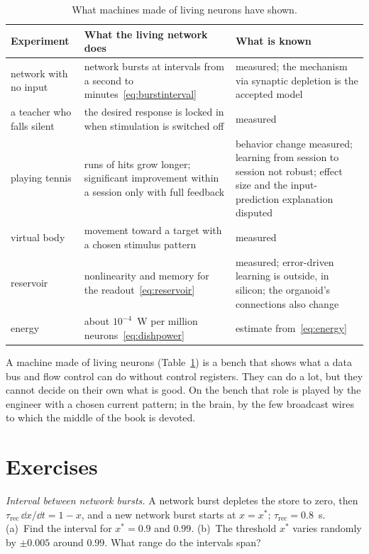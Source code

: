 \begin{table}[t]
\centering
\footnotesize
\setlength{\tabcolsep}{4pt}
\renewcommand{\arraystretch}{1.15}
\begin{tabular}{>{\raggedright}p{2.8cm}>{\raggedright}p{4.2cm}>{\raggedright\arraybackslash}p{5.8cm}}
\toprule
Experiment & What the living network does & What is known \\
\midrule
network with no input & network bursts at intervals from a second to minutes~\eqref{eq:burstinterval} & measured; the mechanism via synaptic depletion is the accepted model \\
a teacher who falls silent & the desired response is locked in when stimulation is switched off & measured \\
playing tennis & runs of hits grow longer; significant improvement within a session only with full feedback & behavior change measured; learning from session to session not robust; effect size and the input-prediction explanation disputed \\
virtual body & movement toward a target with a chosen stimulus pattern & measured \\
reservoir & nonlinearity and memory for the readout~\eqref{eq:reservoir} & measured; error-driven learning is outside, in silicon; the organoid's connections also change \\
energy & about $10^{-4}$~W per million neurons~\eqref{eq:dishpower} & estimate from~\eqref{eq:energy} \\
\bottomrule
\end{tabular}
\caption{What machines made of living neurons have shown.}
\label{tab:livingmachine}
\end{table}

A machine made of living neurons (Table~\ref{tab:livingmachine}) is a bench that shows what a data bus and flow control can do without control registers. They can do a lot, but they cannot decide on their own what is good. On the bench that role is played by the engineer with a chosen current pattern; in the brain, by the few broadcast wires to which the middle of the book is devoted.

\section{Exercises}

\begin{exercise}[\lvlA]
\label{ex:21:1}
\emph{Interval between network bursts.} A network burst depletes the store to zero, then $\tau_{\text{rec}}\,\dd x/\dd t=1-x$, and a new network burst starts at $x=x^*$; $\tau_{\text{rec}}=0.8$~s. (a)~Find the interval for $x^*=0.9$ and $0.99$. (b)~The threshold $x^*$ varies randomly by $\pm0.005$ around $0.99$. What range do the intervals span?
\end{exercise}

